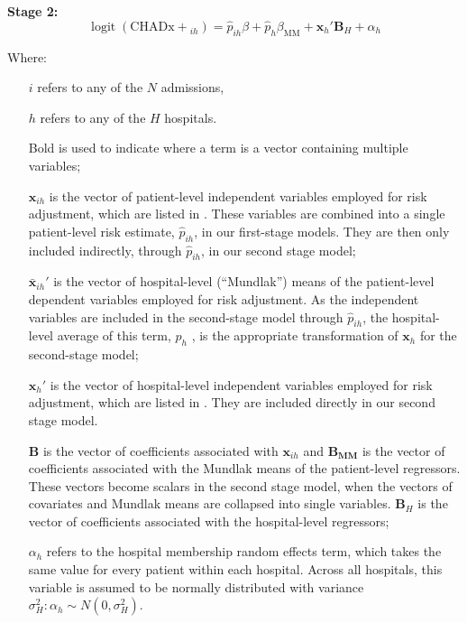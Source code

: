 \documentclass[submission]{grattan}
\begin{document}
\textbf{Stage 2:}
\[\operatorname{logit}(\mathrm{CHADx+}_{{ih}}) = {\hat{p}}_{{ih}}\beta + \hat{p}_{h}\beta_{\text{MM}} + \mathbf{x}_{h}'\mathbf{B}_{H} + \alpha_{h}\]

Where:

\begin{itemize}
\item[\(i\)] refers to any of the \(N\) admissions,
\item[\(h\)] refers to any of the \(H\) hospitals.
\item[] Bold is used to indicate where a term is a vector containing multiple variables;
\item[\(\mathbf{x}_{{ih}}\)] is the vector of patient-level independent variables employed for risk adjustment, which are listed in .
These variables are combined into a single patient-level risk estimate, \({\hat{p}}_{{ih}}\), in our first-stage models.
They are then only included indirectly, through \({\hat{p}}_{{ih}}\), in our second stage model;
\item[\(\bar{\mathbf{x}}_{ih}'\)] is the vector of hospital-level (``Mundlak'') means of the patient-level dependent variables employed for risk adjustment.
As the independent variables are included in the second-stage model through \(\hat{p}_{{ih}}\), the hospital-level average of this term, \(\hat{p}_{{h}}\) , is the appropriate transformation of \(\mathbf{x}_h\) for the second-stage model;
\item[\(\mathbf{x}_{h}'\)] is the vector of hospital-level independent variables employed for risk adjustment, which are listed in .
They are included directly in our second stage model.
\item[\(\mathbf{B}\)] is the vector of coefficients associated with \(\mathbf{x}_{{ih}}\) and \(\mathbf{B}_{\mathbf{\text{MM}}}\) is the vector of coefficients associated with the Mundlak means of the patient-level regressors.
These vectors become scalars in the second stage model, when the vectors of covariates and Mundlak means are collapsed into single variables. \(\mathbf{B}_{H}\) is the vector of coefficients associated with the hospital-level regressors;
\item[\(\alpha_{h}\)] refers to the hospital membership random effects term, which takes the same value for every patient within each hospital.
Across all hospitals, this variable is assumed to be normally distributed with variance \(\sigma_{H}^{2}:\alpha_{h}\sim N\left( 0,\sigma_{H}^{2} \right)\).
\end{itemize}
\end{document}
